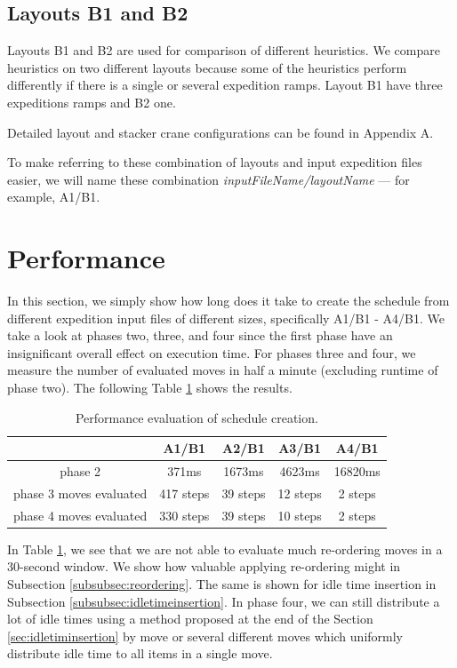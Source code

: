 \documentclass{ctuthesis}
\begin{document}
\subsection{Layouts B1 and B2}
\label{subsec:B}

Layouts B1 and B2 are used for comparison of different heuristics. We compare heuristics on two different layouts because some of the heuristics perform differently if there is a single or several expedition ramps. Layout B1 have three expeditions ramps and B2 one. 

Detailed layout and stacker crane configurations can be found in Appendix A.

To make referring to these combination of layouts and input expedition files easier, we will name these combination \emph{inputFileName/layoutName} — for example, A1/B1.

\section{Performance}

In this section, we simply show how long does it take to create the schedule from different expedition input files of different sizes, specifically A1/B1 - A4/B1. We take a look at phases two, three, and four since the first phase have an insignificant overall effect on execution time. For phases three and four, we measure the number of evaluated moves in half a minute (excluding runtime of phase two). The following Table \ref{tab:perform} shows the results.

\begin{table}[H]
\begin{tabular}{ |c| c c c c|} 
\hline
 & A1/B1 & A2/B1 & A3/B1 & A4/B1\\ 
\hline
phase 2 & 371ms & 1673ms & 4623ms & 16820ms \\
\hline
phase 3 moves evaluated & 417 steps & 39 steps & 12 steps & 2 steps \\ 
\hline
phase 4 moves evaluated & 330 steps & 39 steps & 10 steps & 2 steps \\ 
\hline
\end{tabular}
\caption{Performance evaluation of schedule creation.} \label{tab:perform}
\end{table}

In Table \ref{tab:perform}, we see that we are not able to evaluate much re-ordering moves in a 30-second window. We show how valuable applying re-ordering might in Subsection \ref{subsubsec:reordering}. The same is shown for idle time insertion in Subsection \ref{subsubsec:idletimeinsertion}. In phase four, we can still distribute a lot of idle times using a method proposed at the end of the Section \ref{sec:idletiminsertion} by move or several different moves which uniformly distribute idle time to all items in a single move. 
\end{document}
